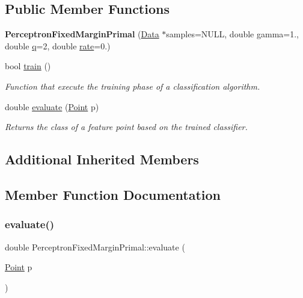 \subsection*{Public Member Functions}
\begin{DoxyCompactItemize}
\item 
\mbox{\label{class_perceptron_fixed_margin_primal_adfb619eab2be28bd10af8efadf62e703}} 
{\bfseries Perceptron\+Fixed\+Margin\+Primal} (\hyperlink{class_data}{Data} $\ast$samples=N\+U\+LL, double gamma=1., double \hyperlink{class_primal_classifier_a746ad2ff93fb77d82ae389f90dbdc89e}{q}=2, double \hyperlink{class_classifier_af9867e5919742de1303dd971a9a1c19a}{rate}=0.)
\item 
bool \hyperlink{class_perceptron_fixed_margin_primal_ad41c2a42c4a819c03bf9879110b0f99f}{train} ()
\begin{DoxyCompactList}\small\item\em Function that execute the training phase of a classification algorithm. \end{DoxyCompactList}\item 
double \hyperlink{class_perceptron_fixed_margin_primal_af72c3dde96f1f1b803c7b522b5c1cc0f}{evaluate} (\hyperlink{class_point}{Point} p)
\begin{DoxyCompactList}\small\item\em Returns the class of a feature point based on the trained classifier. \end{DoxyCompactList}\end{DoxyCompactItemize}
\subsection*{Additional Inherited Members}


\subsection{Member Function Documentation}
\mbox{\label{class_perceptron_fixed_margin_primal_af72c3dde96f1f1b803c7b522b5c1cc0f}} 
\subsubsection{\texorpdfstring{evaluate()}{evaluate()}}
{\footnotesize\ttfamily double Perceptron\+Fixed\+Margin\+Primal\+::evaluate (\begin{DoxyParamCaption}\item[{\hyperlink{class_point}{Point}}]{p }\end{DoxyParamCaption})\hspace{0.3cm}{\ttfamily [virtual]}}



